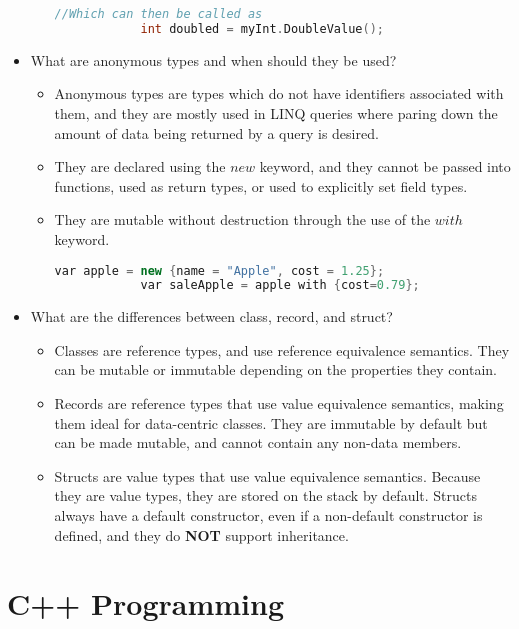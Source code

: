 \documentclass{article}
\begin{document}
\begin{itemize}
\begin{itemize}
\begin{lstlisting}[language=C++]
            //Which can then be called as
            int doubled = myInt.DoubleValue();\end{lstlisting}
    \end{itemize}
    \item What are anonymous types and when should they be used?
    \begin{itemize}
        \item Anonymous types are types which do not have identifiers associated with them, and they are mostly used in LINQ queries where paring down the amount of data being returned by a query is desired.
        \item They are declared using the $new$ keyword, and they cannot be passed into functions, used as return types, or used to explicitly set field types.
        \item They are mutable without destruction through the use of the $with$ keyword.
        \begin{lstlisting}[language=C++]
            var apple = new {name = "Apple", cost = 1.25};
            var saleApple = apple with {cost=0.79}; \end{lstlisting}
    \end{itemize}
    \item What are the differences between class, record, and struct?
    \begin{itemize}
        \item Classes are reference types, and use reference equivalence semantics. They can be mutable or immutable depending on the properties they contain.
        \item Records are reference types that use value equivalence semantics, making them ideal for data-centric classes. They are immutable by default but can be made mutable, and cannot contain any non-data members. 
        \item Structs are value types that use value equivalence semantics. Because they are value types, they are stored on the stack by default. Structs always have a default constructor, even if a non-default constructor is defined, and they do \textbf{NOT} support inheritance.
    \end{itemize}
    
    
\end{itemize}


\newpage
\section{C++ Programming}
\end{document}
